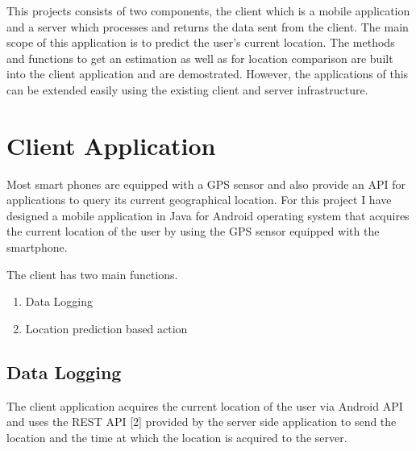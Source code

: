 \documentclass[conference]{IEEEtran}
\begin{document}
This projects consists of two components, the client which is a mobile application and a server which processes and returns the data sent from the client. The main scope of this application is to predict the user's current location. The methods and functions to get an estimation as well as for location comparison are built into the client application and are demostrated. However, the applications of this can be extended easily using the existing client and server infrastructure.

\section{Client Application}
Most smart phones are equipped with a GPS sensor and also provide an API for applications to query its current geographical location. For this project I have designed a mobile application in Java for Android operating system that acquires the current location of the user by using the GPS sensor equipped with the smartphone.

The client has two main functions.
\begin{enumerate}
  \item Data Logging
  \item Location prediction based action
\end{enumerate}

\subsection{Data Logging}
The client application acquires the current location of the user via Android API and uses the REST API [2] provided by the server side application to send the location and the time at which the location is acquired to the server.

\begin{table}[h!]
  \centering
  \caption{Data stored to server by the client}
  \label{tab:label_client_data}
\end{table}
\end{document}
